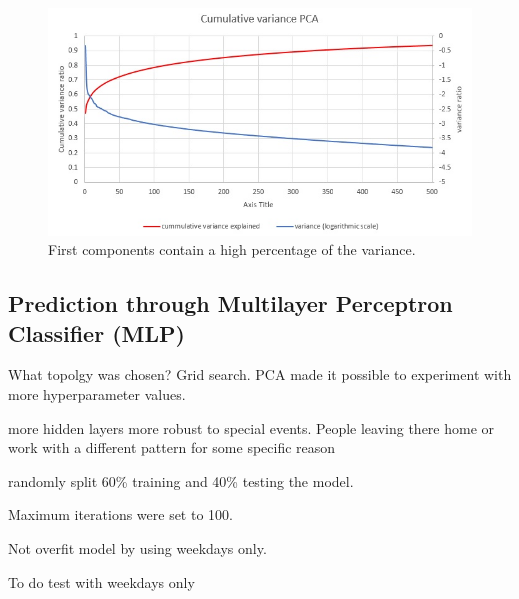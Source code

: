 \documentclass[12pt, a4paper]{report}
\theoremstyle{definition}
\theoremstyle{definition}%
\theoremstyle{definition}%
\theoremstyle{definition}%
\theoremstyle{definition}%
\theoremstyle{definition}%
\begin{document}
\begin{figure}[h]	
	\includegraphics[scale=0.50]{cumulative_variance_pca.jpg}
	\centering
	\caption{First components contain a high percentage of the variance. }
	\label{fig:cumulative_variance_pca}
\end{figure}


%



\subsection{Prediction through Multilayer Perceptron Classifier (MLP)}


What topolgy was chosen? Grid search.
PCA made it possible to experiment with more hyperparameter values. 

more hidden layers more robust to special events. People leaving there home or work with a different pattern for some specific reason

randomly split 60\% training and 40\% testing the model.

Maximum iterations were set to 100.

Not overfit model by using weekdays only.

To do test with weekdays only
\end{document}
